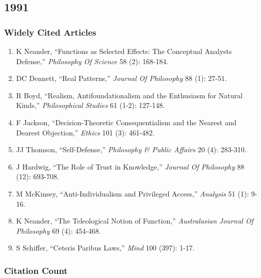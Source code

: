 \documentclass[
  10pt,
  letterpaper,
  DIV=11,
  numbers=noendperiod,
  twoside]{scrartcl}
\providecommand{\tightlist}{%
  \setlength{\itemsep}{0pt}\setlength{\parskip}{0pt}}\usepackage{longtable,booktabs,array}
\begin{document}
\newpage

\subsection{1991}\label{sec-s1991}

\subsubsection*{Widely Cited Articles}\label{widely-cited-articles-15}

\begin{enumerate}
\def\labelenumi{\arabic{enumi}.}
\tightlist
\item
  K Neander, ``Functions as Selected Effects: The Conceptual Analysts
  Defense,'' \emph{Philosophy Of Science} 58 (2): 168-184.
\item
  DC Dennett, ``Real Patterns,'' \emph{Journal Of Philosophy} 88 (1):
  27-51.
\item
  R Boyd, ``Realism, Antifoundationalism and the Enthusiasm for Natural
  Kinds,'' \emph{Philosophical Studies} 61 (1-2): 127-148.
\item
  F Jackson, ``Decision-Theoretic Consequentialism and the Nearest and
  Dearest Objection,'' \emph{Ethics} 101 (3): 461-482.
\item
  JJ Thomson, ``Self-Defense,'' \emph{Philosophy \& Public Affairs} 20
  (4): 283-310.
\item
  J Hardwig, ``The Role of Trust in Knowledge,'' \emph{Journal Of
  Philosophy} 88 (12): 693-708.
\item
  M McKinsey, ``Anti-Individualism and Privileged Access,''
  \emph{Analysis} 51 (1): 9-16.
\item
  K Neander, ``The Teleological Notion of Function,'' \emph{Australasian
  Journal Of Philosophy} 69 (4): 454-468.
\item
  S Schiffer, ``Ceteris Paribus Laws,'' \emph{Mind} 100 (397): 1-17.
\end{enumerate}

\subsubsection*{Citation Count}\label{sec-count-1991}
\end{document}

